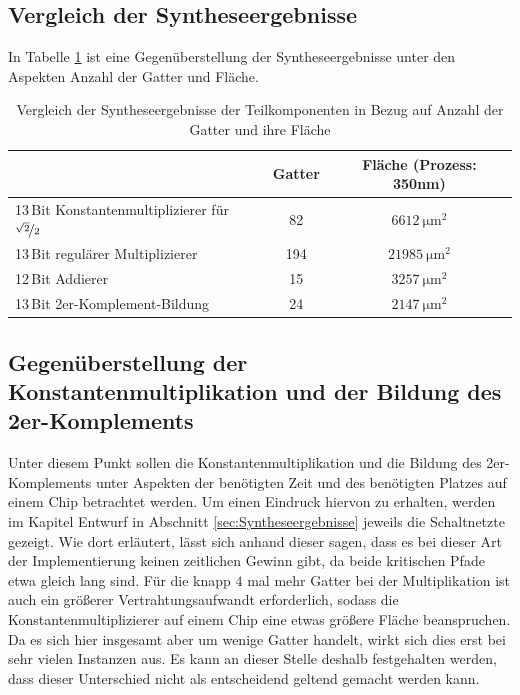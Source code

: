 \subsection{Vergleich der Syntheseergebnisse}
 In Tabelle \ref{tab:VergleichSyntheseergebnisse} ist eine Gegenüberstellung der Syntheseergebnisse unter den Aspekten Anzahl der Gatter und Fläche.
\begin{table}[!ht]
\centering
 \caption{Vergleich der Syntheseergebnisse der Teilkomponenten in Bezug auf Anzahl der Gatter und ihre Fläche}
 \label{tab:VergleichSyntheseergebnisse}
 \begin{tabular}{lcc}
 \hline
				&Gatter  	&Fläche (Prozess: 350nm) \\
  \hline	
  13\,Bit Konstantenmultiplizierer für $\nicefrac{\sqrt{2}}{2}$	& 82		& $\SI{6612}{\um^2}$ \\
  13\,Bit regulärer Multiplizierer				& 194		& $\SI{21985}{\um^2}$\\
  12\,Bit Addierer						& 15		& $\SI{3257}{\um^2}$\\
  13\,Bit 2er-Komplement-Bildung				& 24		& $\SI{2147}{\um^2}$\\
  \hline
 \end{tabular}
\end{table}



\subsection{Gegenüberstellung der Konstantenmultiplikation und der Bildung des 2er-Komplements}

Unter diesem Punkt sollen die Konstantenmultiplikation und die Bildung des 2er-Komplements unter Aspekten der benötigten Zeit und des benötigten Platzes auf einem Chip 
betrachtet werden. Um einen Eindruck hiervon zu erhalten, werden im Kapitel Entwurf in Abschnitt \ref{sec:Syntheseergebnisse} jeweils die Schaltnetzte 
gezeigt.
Wie dort erläutert, lässt sich anhand dieser sagen, dass es bei dieser Art der Implementierung keinen zeitlichen Gewinn gibt, da beide kritischen Pfade etwa gleich lang 
sind. Für die knapp $4$ mal mehr Gatter bei der Multiplikation ist auch ein größerer Vertrahtungsaufwandt erforderlich, sodass die Konstantenmultiplizierer
auf einem Chip eine etwas größere Fläche beanspruchen. Da es sich hier insgesamt aber um wenige Gatter handelt, wirkt sich dies erst bei sehr vielen Instanzen aus.
Es kann an dieser Stelle deshalb festgehalten werden, dass dieser Unterschied nicht als entscheidend geltend gemacht werden kann.



